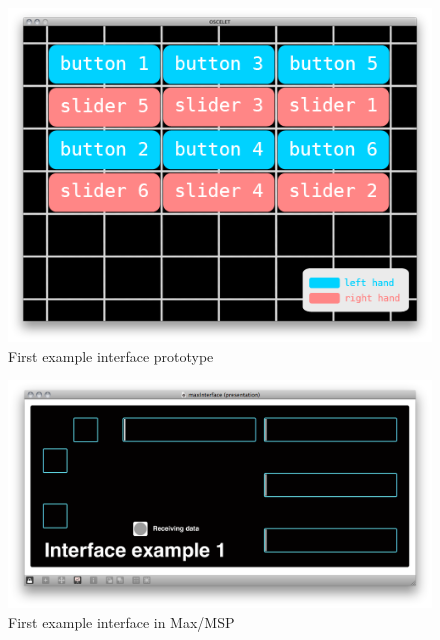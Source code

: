 \documentclass[11pt,a4paper,oneside]{article}
\begin{document}
\begin{figure}[p]
  \centering
    \includegraphics[width=1\textwidth]{../interfaces/1_example.png}
    \caption{First example interface prototype}
\end{figure}

\begin{figure}[p]
  \centering
    \includegraphics[width=1\textwidth]{../interfaces/1_example_max.png}
    \caption{First example interface in Max/MSP}
\end{figure}
\end{document}
